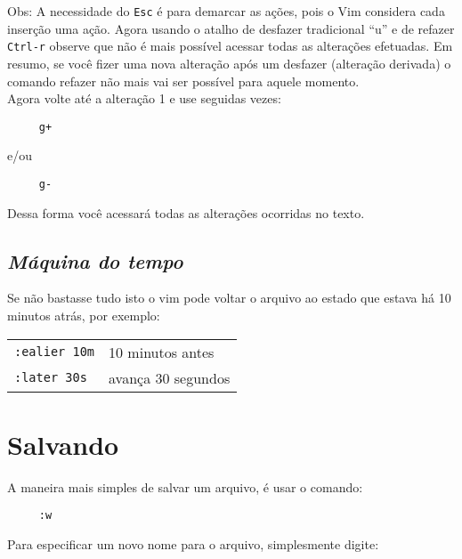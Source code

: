 Obs: A necessidade do {\tt Esc} é para demarcar as ações, pois o Vim
considera cada inserção uma ação.  Agora usando o atalho de desfazer
tradicional ``u'' e de refazer {\tt Ctrl-r} observe que não é mais possível
acessar todas as alterações efetuadas. Em resumo, se você fizer uma
nova alteração após um desfazer (alteração derivada) o comando refazer
não mais vai ser possível para aquele momento. \\

Agora volte até a alteração 1 e use seguidas vezes:

\begin{verbatim}
     g+
\end{verbatim}

e/ou

\begin{verbatim}
     g-
\end{verbatim}

Dessa forma você acessará todas as alterações ocorridas no texto.


\subsection{{\em Máquina do tempo}}
\label{Maquina do tempo}

Se não bastasse tudo isto o vim pode voltar o arquivo ao estado 
que estava há 10 minutos atrás, por exemplo:
\begin{table}[htb]\begin{center} \begin{tabular}{ll} \hline
    \verb|:ealier 10m| & 10 minutos antes\\
    \verb|:later 30s| & avança 30 segundos\\
\hline \end{tabular}\end{center}\end{table}

\section{Salvando}
\label{sec:Salvando}

A maneira mais simples de salvar um arquivo, é usar o comando:

\begin{verbatim}
     :w
\end{verbatim}


Para especificar um novo nome para o arquivo, simplesmente digite:

